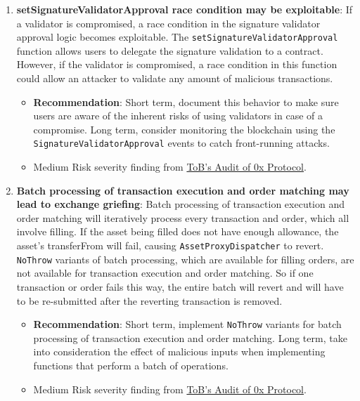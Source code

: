 \begin{enumerate}
\item\textbf{setSignatureValidatorApproval race condition may be exploitable}: If a validator is compromised, a race condition in the signature validator approval logic becomes exploitable. The \verb|setSignatureValidatorApproval| function allows users to delegate the signature validation to a contract. However, if the validator is compromised, a race condition in this function could allow an attacker to validate any amount of malicious transactions.
	\begin{itemize}
	\item\textbf{Recommendation}: Short term, document this behavior to make sure users are aware of the inherent risks of using validators in case of a compromise. Long term, consider monitoring the blockchain using the \verb|SignatureValidatorApproval| events to catch front-running attacks.
	\item Medium Risk severity finding from \href{https://github.com/trailofbits/publications/blob/master/reviews/0x-protocol.pdf}{ToB’s Audit of 0x Protocol}.
	\end{itemize}

\item\textbf{Batch processing of transaction execution and order matching may lead to exchange griefing}: Batch processing of transaction execution and order matching will iteratively process every transaction and order, which all involve filling. If the asset being filled does not have enough allowance, the asset’s transferFrom will fail, causing \verb|AssetProxyDispatcher| to revert. \verb|NoThrow| variants of batch processing, which are available for filling orders, are not available for transaction execution and order matching. So if one transaction or order fails this way, the entire batch will revert and will have to be re-submitted after the reverting transaction is removed.
	\begin{itemize}
	\item\textbf{Recommendation}: Short term, implement \verb|NoThrow| variants for batch processing of transaction execution and order matching. Long term, take into consideration the effect of malicious inputs when implementing functions that perform a batch of operations.
	\item Medium Risk severity finding from \href{https://github.com/trailofbits/publications/blob/master/reviews/0x-protocol.pdf}{ToB’s Audit of 0x Protocol}.
	\end{itemize}


\end{enumerate}
